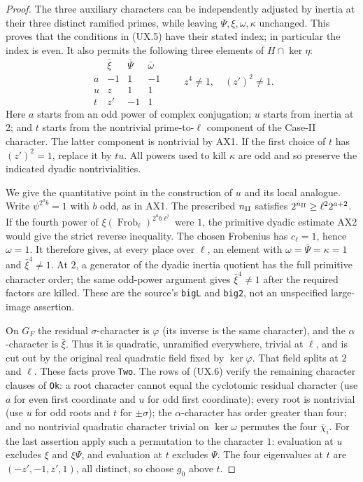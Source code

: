 \begin{proof}
The three auxiliary characters can be independently adjusted
by inertia at their three distinct ramified primes, while
leaving $\Psi,\xi,\omega,\kappa$ unchanged.  This proves
that the conditions in (UX.5) have their stated index; in
particular the index is even.  It also permits the following
three elements of $H\cap\ker\eta$:
\[
\begin{array}{c|ccc}
 &\bar\xi&\bar\Psi&\bar\omega\\ \hline
 a&-1&1&-1\\
 u&z&1&1\\
 t&z'&-1&1
\end{array}
\qquad z^4\ne1,\quad (z')^2\ne1.
 \tag{UX.6}
\]
Here $a$ starts from an odd power of complex conjugation;
$u$ starts from inertia at $2$; and $t$ starts from the
nontrivial prime-to-$\ell$ component of the Case-II character.
The latter component is nontrivial by AX1.  If the first
choice of $t$ has $(z')^2=1$, replace it by $tu$.
All powers used to kill $\kappa$ are odd and so preserve
the indicated dyadic nontrivialities.

We give the quantitative point in the construction of $u$
and its local analogue.  Write $\psi^{2^a b}=1$ with $b$
odd, as in AX1.  The prescribed $n_{\rm II}$ satisfies
$2^{n_{\rm II}}\ge\ell^2 2^{a+2}$.  If the fourth power
of $\xi(\operatorname{Frob}_\ell)^{2^a b\ell^j}$ were $1$,
the primitive dyadic estimate AX2 would give the strict
reverse inequality.  The chosen Frobenius has $c_\ell=1$,
hence $\omega=1$.  It therefore gives, at every place over
$\ell$, an element with
$\omega=\bar\Psi=\kappa=1$ and $\bar\xi^4\ne1$.
At $2$, a generator of the dyadic inertia quotient has the
full primitive character order; the same odd-power argument
gives $\bar\xi^4\ne1$ after the required factors are killed.
These are the source's \texttt{bigL} and \texttt{big2}, not
an unspecified large-image assertion.

On $G_F$ the residual $\sigma$-character is $\varphi$ (its
inverse is the same character), and the $\alpha$-character
is $\bar\xi$.  Thus it is quadratic, unramified everywhere,
trivial at $\ell$, and is cut out by the original real
quadratic field fixed by $\ker\varphi$.  That field splits
at $2$ and $\ell$.  These facts prove \texttt{Two}.
The rows of (UX.6) verify the remaining character clauses
of \texttt{Ok}: a root character cannot equal the
cyclotomic residual character (use $a$ for even first
coordinate and $u$ for odd first coordinate); every root
is nontrivial (use $u$ for odd roots and $t$ for
$\pm\sigma$); the $\alpha$-character has order greater
than four; and no nontrivial quadratic character trivial
on $\ker\omega$ permutes the four $\bar\chi_i$.
For the last assertion apply such a permutation to the
character $1$: evaluation at $u$ excludes $\xi$ and
$\xi\Psi$, and evaluation at $t$ excludes $\Psi$.
The four eigenvalues at $t$ are $(-z',-1,z',1)$, all
distinct, so choose $g_0$ above $t$.


\end{proof}

